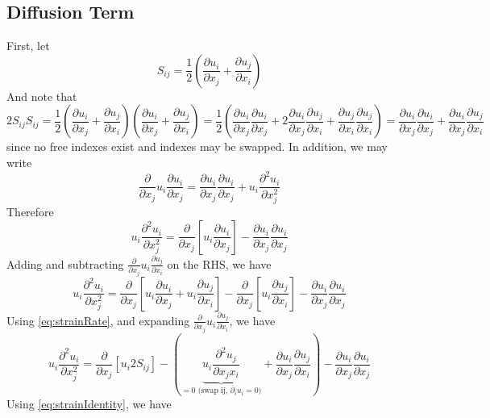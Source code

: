 \documentclass[11pt]{article}
\newcommand{\PD}{\partial}
\begin{document}
\subsection{Diffusion Term}
First, let
\begin{equation} \label{eq:strainRate}
	S_{ij} = \frac{1}{2}
	\left(
	\frac{\PD u_i}{\PD x_j} + 
	\frac{\PD u_j}{\PD x_i}
	\right)
\end{equation}
And note that
\begin{equation} \label{eq:strainIdentity}
	2 S_{ij} S_{ij} =
	\frac{1}{2} \left( \frac{\PD u_i}{\PD x_j} + \frac{\PD u_j}{\PD x_i} \right)
	\left( \frac{\PD u_i}{\PD x_j} + \frac{\PD u_j}{\PD x_i} \right)
	= \frac{1}{2} \left( \frac{\PD u_i}{\PD x_j} \frac{\PD u_i}{\PD x_j}
	+ 2 \frac{\PD u_i}{\PD x_j} \frac{\PD u_j}{\PD x_i} 
	+ \frac{\PD u_j}{\PD x_i} \frac{\PD u_j}{\PD x_i} \right)
	= \frac{\PD u_i}{\PD x_j} \frac{\PD u_i}{\PD x_j}
	+ \frac{\PD u_i}{\PD x_j} \frac{\PD u_j}{\PD x_i}
\end{equation}
since no free indexes exist and indexes may be swapped. In addition, we may write
\begin{equation}
	\frac{\PD}{\PD x_j} u_i \frac{\PD u_i}{\PD x_j} =
	\frac{\PD u_i}{\PD x_j}\frac{\PD u_i}{\PD x_j} + 
	u_i \frac{\PD^2 u_i}{\PD x_j^2}
\end{equation}
Therefore
\begin{equation}
	u_i \frac{\PD^2 u_i}{\PD x_j^2} = 
	\frac{\PD}{\PD x_j} \left[ u_i \frac{\PD u_i}{\PD x_j} \right] - 
	\frac{\PD u_i}{\PD x_j}\frac{\PD u_i}{\PD x_j}
\end{equation}
Adding and subtracting $\frac{\PD}{\PD x_j} u_i \frac{\PD u_j}{\PD x_i}$ on the RHS, we have
\begin{equation}
	u_i \frac{\PD^2 u_i}{\PD x_j^2} = 
	\frac{\PD}{\PD x_j} \left[ u_i \frac{\PD u_i}{\PD x_j} + u_i \frac{\PD u_j}{\PD x_i} \right] - 
	\frac{\PD}{\PD x_j} \left[ u_i \frac{\PD u_j}{\PD x_i} \right] - 
	\frac{\PD u_i}{\PD x_j}\frac{\PD u_i}{\PD x_j}
\end{equation}
Using \ref{eq:strainRate}, and expanding $\frac{\PD}{\PD x_j} u_i \frac{\PD u_j}{\PD x_i}$, we have
\begin{equation}
	u_i \frac{\PD^2 u_i}{\PD x_j^2} = 
	\frac{\PD}{\PD x_j} \left[ u_i 2 S_{ij} \right] - 
	\left( 
	\underbrace{u_i \frac{\PD^2 u_j}{\PD x_j x_i}}_{=0 \text{ (swap ij, $\PD_i u_i =0$)}}
	+
	\frac{\PD u_i}{\PD x_j} \frac{\PD u_j}{\PD x_i}
	\right) - 
	\frac{\PD u_i}{\PD x_j}\frac{\PD u_i}{\PD x_j}
\end{equation}
Using \ref{eq:strainIdentity}, we have
\end{document}
